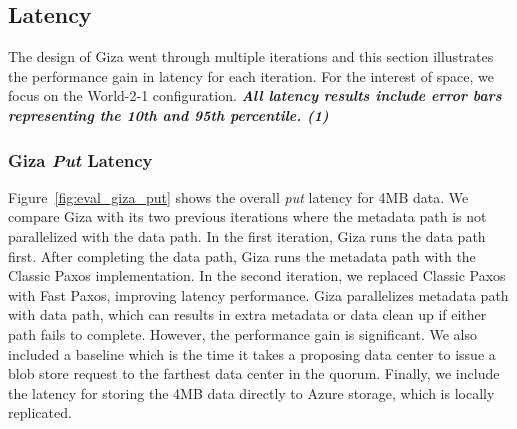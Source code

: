

\subsection{\name Latency}

The design of Giza went through multiple iterations and this section illustrates
the performance gain in latency for each iteration. For the interest of space,
we focus on the World-2-1 configuration. \textit{\textbf{All latency results include error bars representing the 10th and 95th percentile. (1)}}

\subsubsection{Giza {\em Put} Latency}


Figure~\ref{fig:eval_giza_put} shows the \name overall {\em put} latency for 4MB
data. We compare Giza with its two previous iterations where the metadata path
is not parallelized with the data path. In the first iteration, Giza runs the
data path first. After completing the data path, Giza runs the metadata path
with the Classic Paxos implementation. In the second iteration, we replaced
Classic Paxos with Fast Paxos, improving latency performance. Giza parallelizes
metadata path with data path, which can results in extra metadata or data clean
up if either path fails to complete. However, the performance gain is
significant. We also included a baseline which is the time it takes a proposing
data center to issue a blob store request to the farthest data center in the
quorum. Finally, we include the latency for storing the 4MB data directly to
Azure storage, which is locally replicated.

